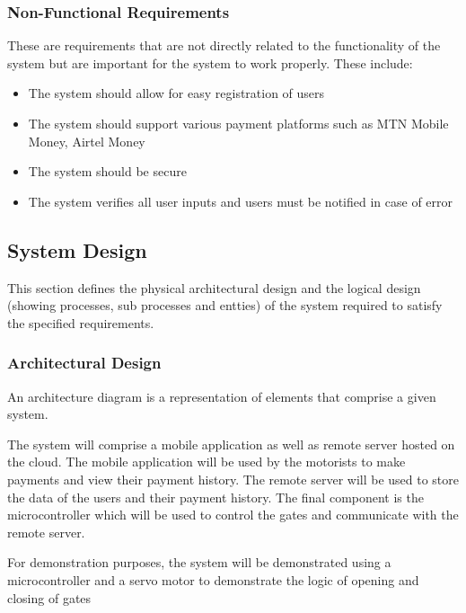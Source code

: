 \subsubsection{Non-Functional Requirements}
These are requirements that are not directly related to the functionality of the system but are important for the system to work properly. These include:
\begin{itemize}
    \item The system should allow for easy registration of users
    \item The system should support various payment platforms such as MTN Mobile Money, Airtel Money
    \item The system should be secure
    \item The system verifies all user inputs and users must be notified in case of error
\end{itemize}

\subsection{System Design}
This section defines the physical architectural design and the logical design (showing processes, sub processes and entties)  of the system required to satisfy the specified requirements.

\subsubsection{Architectural Design}
An architecture diagram is a representation of elements that comprise a given system\cite{tilley2019systems}.

The system will comprise a mobile application as well as remote server hosted on the cloud. The mobile application will be used by the motorists to make payments and view their payment history. The remote server will be used to store the data of the users and their payment history. The final component is the microcontroller which will be used to control the gates and communicate with the remote server.

For demonstration purposes, the system will be demonstrated using a microcontroller and a servo motor to demonstrate the logic of opening and closing of gates


